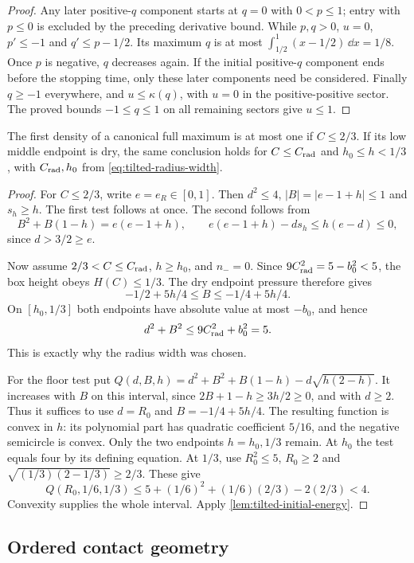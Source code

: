 \begin{proof}
Any later positive-$q$ component starts at $q=0$ with $0<p\le1$;
entry with $p\le0$ is excluded by the preceding derivative bound.
While $p,q>0$, $u=0$, $p'\le-1$ and $q'\le p-1/2$.
Its maximum $q$ is at most
$\int_{1/2}^1(x-1/2)\,\dd x=1/8$. Once $p$ is negative,
$q$ decreases again. If the initial positive-$q$ component ends
before the stopping time, only these later components need be
considered. Finally $q\ge-1$ everywhere, and
$u\le\kappa(q)$, with $u=0$ in the positive-positive sector.
The proved bounds $-1\le q\le1$ on all remaining sectors give
$u\le1$.
\end{proof}

\begin{lemma}\label{lem:tilted-unit-regions}
The first density of a canonical full maximum is at most one if
\(C\le2/3\). If its low middle endpoint is dry, the same conclusion
holds for \(C\le C_{\rm rad}\) and \(h_0\le h<1/3\), with
\(C_{\rm rad},h_0\) from \eqref{eq:tilted-radius-width}.
\end{lemma}
\begin{proof}
For \(C\le2/3\), write \(e=e_R\in[0,1]\).
Then \(d^2\le4\), \(|B|=|e-1+h|\le1\) and \(s_h\ge h\).
The first test follows at once. The second follows from
\[
B^2+B(1-h)=e(e-1+h),\qquad
 e(e-1+h)-ds_h\le h(e-d)\le0,
\]
since \(d>3/2\ge e\).

Now assume \(2/3<C\le C_{\rm rad}\), \(h\ge h_0\), and \(n_-=0\).
Since \(9C_{\rm rad}^2=5-b_0^2<5\), the box height obeys
\(H(C)\le1/3\). The dry endpoint pressure therefore gives
\[
-1/2+5h/4\le B\le-1/4+5h/4.
\]
On \([h_0,1/3]\) both endpoints have absolute value at most
\(-b_0\), and hence
\[
d^2+B^2\le9C_{\rm rad}^2+b_0^2=5.
\]
This is exactly why the radius width was chosen.

For the floor test put
\(Q(d,B,h)=d^2+B^2+B(1-h)-d\sqrt{h(2-h)}\).
It increases with \(B\) on this interval, since
\(2B+1-h\ge3h/2\ge0\), and with \(d\ge2\).
Thus it suffices to use $d=R_0$ and $B=-1/4+5h/4$.
The resulting function is convex in $h$: its polynomial part
has quadratic coefficient $5/16$, and the negative semicircle is convex.
Only the two endpoints $h=h_0,1/3$ remain.
At $h_0$ the test equals four by its defining equation.
At $1/3$, use $R_0^2\le5$, $R_0\ge2$ and
$\sqrt{(1/3)(2-1/3)}\ge2/3$. These give
\[
 Q(R_0,1/6,1/3)\le5+(1/6)^2+(1/6)(2/3)-2(2/3)<4.
\]
Convexity supplies the whole interval.
Apply \cref{lem:tilted-initial-energy}.
\end{proof}

\subsection{Ordered contact geometry}

